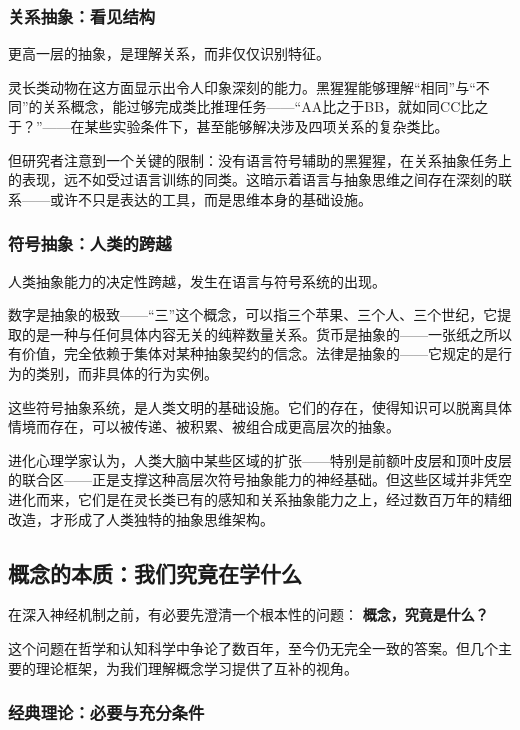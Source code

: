\documentclass[11pt]{article}
\begin{document}
\subsubsection{关系抽象：看见结构}
\label{sec:org7b347ef}

更高一层的抽象，是理解关系，而非仅仅识别特征。

灵长类动物在这方面显示出令人印象深刻的能力。黑猩猩能够理解“相同”与“不同”的关系概念，能过够完成类比推理任务——“AA比之于BB，就如同CC比之于？”——在某些实验条件下，甚至能够解决涉及四项关系的复杂类比。

但研究者注意到一个关键的限制：没有语言符号辅助的黑猩猩，在关系抽象任务上的表现，远不如受过语言训练的同类。这暗示着语言与抽象思维之间存在深刻的联系——或许不只是表达的工具，而是思维本身的基础设施。
\subsubsection{符号抽象：人类的跨越}
\label{sec:orgfc6519b}

人类抽象能力的决定性跨越，发生在语言与符号系统的出现。

数字是抽象的极致——“三”这个概念，可以指三个苹果、三个人、三个世纪，它提取的是一种与任何具体内容无关的纯粹数量关系。货币是抽象的——一张纸之所以有价值，完全依赖于集体对某种抽象契约的信念。法律是抽象的——它规定的是行为的类别，而非具体的行为实例。

这些符号抽象系统，是人类文明的基础设施。它们的存在，使得知识可以脱离具体情境而存在，可以被传递、被积累、被组合成更高层次的抽象。

进化心理学家认为，人类大脑中某些区域的扩张——特别是前额叶皮层和顶叶皮层的联合区——正是支撑这种高层次符号抽象能力的神经基础。但这些区域并非凭空进化而来，它们是在灵长类已有的感知和关系抽象能力之上，经过数百万年的精细改造，才形成了人类独特的抽象思维架构。
\subsection{概念的本质：我们究竟在学什么}
\label{sec:org4a0b267}

在深入神经机制之前，有必要先澄清一个根本性的问题： \textbf{概念，究竟是什么？}

这个问题在哲学和认知科学中争论了数百年，至今仍无完全一致的答案。但几个主要的理论框架，为我们理解概念学习提供了互补的视角。
\subsubsection{经典理论：必要与充分条件}
\label{sec:org07bfb83}
\end{document}

